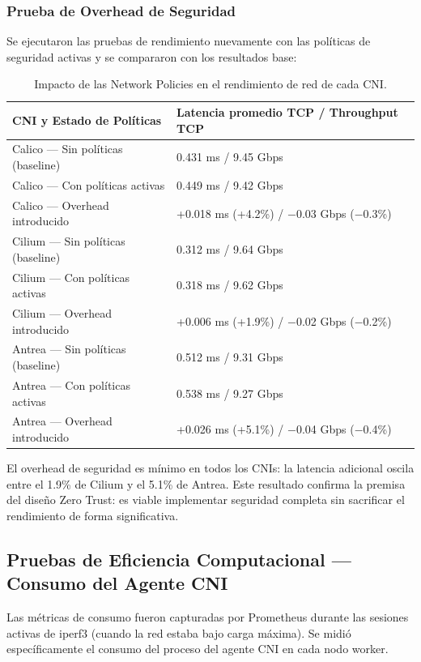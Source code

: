 \subsubsection{Prueba de Overhead de Seguridad}

Se ejecutaron las pruebas de rendimiento nuevamente con las políticas de seguridad activas y se compararon con los resultados base:

\begin{table}[htbp]
\centering
\scriptsize
\begin{tabularx}{\textwidth}{|Y|Y|}
\hline
\textbf{CNI y Estado de Políticas} & \textbf{Latencia promedio TCP / Throughput TCP} \\
\hline
Calico --- Sin políticas (baseline) & 0.431 ms / 9.45 Gbps \\
Calico --- Con políticas activas & 0.449 ms / 9.42 Gbps \\
Calico --- Overhead introducido & +0.018 ms (+4.2\%) / $-$0.03 Gbps ($-$0.3\%) \\
Cilium --- Sin políticas (baseline) & 0.312 ms / 9.64 Gbps \\
Cilium --- Con políticas activas & 0.318 ms / 9.62 Gbps \\
Cilium --- Overhead introducido & +0.006 ms (+1.9\%) / $-$0.02 Gbps ($-$0.2\%) \\
Antrea --- Sin políticas (baseline) & 0.512 ms / 9.31 Gbps \\
Antrea --- Con políticas activas & 0.538 ms / 9.27 Gbps \\
Antrea --- Overhead introducido & +0.026 ms (+5.1\%) / $-$0.04 Gbps ($-$0.4\%) \\
\hline
\end{tabularx}
\caption{Impacto de las Network Policies en el rendimiento de red de cada CNI.}
\end{table}

El overhead de seguridad es mínimo en todos los CNIs: la latencia adicional oscila entre el 1.9\% de Cilium y el 5.1\% de Antrea. Este resultado confirma la premisa del diseño Zero Trust: es viable implementar seguridad completa sin sacrificar el rendimiento de forma significativa.

\subsection{Pruebas de Eficiencia Computacional --- Consumo del Agente CNI}

Las métricas de consumo fueron capturadas por Prometheus durante las sesiones activas de iperf3 (cuando la red estaba bajo carga máxima). Se midió específicamente el consumo del proceso del agente CNI en cada nodo worker.

